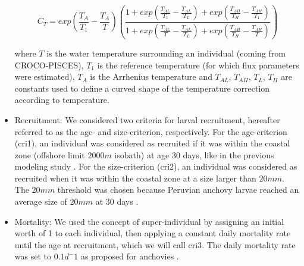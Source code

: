 \begin{itemize}
\begin{equation}
	C_{T} = exp\left ( \frac{T_{A}}{T_{1}} - \frac{T_{A}}{T} \right )
	\left ( \frac
				{1+exp\left ( \frac{T_{AL}}{T_{1}} - \frac{T_{AL}}{T_{L}} \right )
				  +exp\left ( \frac{T_{AH}}{T_{H}} - \frac{T_{AH}}{T_{1}} \right )}
				{1+exp\left ( \frac{T_{AL}}{T} - \frac{T_{AL}}{T_{L}} \right )
				  +exp\left ( \frac{T_{AH}}{T_{H}} - \frac{T_{AH}}{T} \right )}
	\right )
    \label{C_T}
\end{equation}

where $T$ is the water temperature surrounding an individual (coming from CROCO-PISCES), $T_{1}$ is the reference temperature (for which flux parameters were estimated), $T_{A}$ is the Arrhenius temperature \citep{Kooi2009} and $T_{AL}$, $T_{AH}$, $T_{L}$, $T_{H}$ are constants used to define a curved shape of the temperature correction according to temperature.\\

\item Recruitment: We considered two criteria for larval recruitment, hereafter referred to as the
age- and size-criterion, respectively. For the age-criterion (\gls{cri1}), an individual was considered
as recruited if it was within the coastal zone (offshore limit $2000 m$ isobath) at age 30
days, like in the previous modeling study \citep{BrocLett2008}. For the size-criterion (\gls{cri2}), an
individual was considered as recruited when it was within the coastal zone at a size larger
than $20 mm$. The $20 mm$ threshold was chosen because Peruvian anchovy larvae reached
an average size of $20 mm$ at 30 days \citep{CastHern2000, MoreClar2011, RiouOfel2021, OfelMoya2023}.\\

\item Mortality: We used the concept of super-individual \citep{ScheBave1995, ParrEvan2008} by assigning an initial worth of 1 to each individual, then applying a constant daily mortality rate until the age at recruitment, which we will call \gls{cri3}. The daily mortality rate was set to $0.1 d^-1$ as proposed for anchovies \citep{BailHoud1989, Houd2008}.

\end{itemize}

